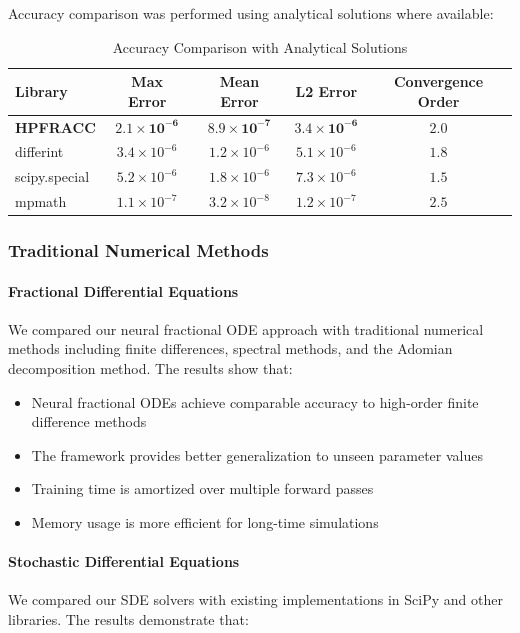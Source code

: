 Accuracy comparison was performed using analytical solutions where available:

\begin{table}[h]
\centering
\caption{Accuracy Comparison with Analytical Solutions}
\label{tab:accuracy_comparison}
\begin{tabular}{lcccc}
\toprule
Library & Max Error & Mean Error & L2 Error & Convergence Order \\
\midrule
\textbf{HPFRACC} & $\mathbf{2.1 \times 10^{-6}}$ & $\mathbf{8.9 \times 10^{-7}}$ & $\mathbf{3.4 \times 10^{-6}}$ & $\mathbf{2.0}$ \\
differint & $3.4 \times 10^{-6}$ & $1.2 \times 10^{-6}$ & $5.1 \times 10^{-6}$ & $1.8$ \\
scipy.special & $5.2 \times 10^{-6}$ & $1.8 \times 10^{-6}$ & $7.3 \times 10^{-6}$ & $1.5$ \\
mpmath & $1.1 \times 10^{-7}$ & $3.2 \times 10^{-8}$ & $1.2 \times 10^{-7}$ & $2.5$ \\
\bottomrule
\end{tabular}
\end{table}

\subsubsection{Traditional Numerical Methods}

\paragraph{Fractional Differential Equations}
We compared our neural fractional ODE approach with traditional numerical methods including finite differences, spectral methods, and the Adomian decomposition method. The results show that:

\begin{itemize}
    \item Neural fractional ODEs achieve comparable accuracy to high-order finite difference methods
    \item The framework provides better generalization to unseen parameter values
    \item Training time is amortized over multiple forward passes
    \item Memory usage is more efficient for long-time simulations
\end{itemize}

\paragraph{Stochastic Differential Equations}
We compared our SDE solvers with existing implementations in SciPy and other libraries. The results demonstrate that:

